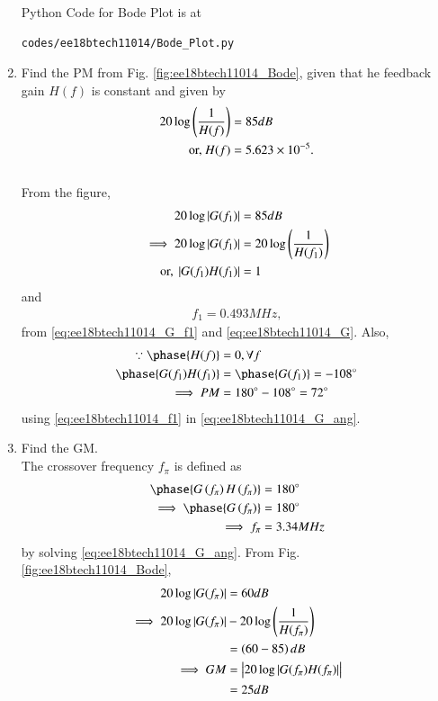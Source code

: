 \begin{enumerate}[label=\thesection.\arabic*.,ref=\thesection.\theenumi]
Python Code for Bode Plot is at
\begin{lstlisting}
codes/ee18btech11014/Bode_Plot.py
\end{lstlisting}

\item Find the PM from  Fig. 	\ref{fig:ee18btech11014_Bode}, given that he feedback gain $H(f)$ is constant and given by 
\begin{align}
20 \log \left(\frac{1}{H(f) }\right) &= 85 dB
\\
\text{or, } H(f) &= 5.623 \times 10^{-5}.
\label{eq:ee18btech11014_H}
\end{align}
\\
\solution From the figure, 
\begin{align}
\label{eq:ee18btech11014_G_f1}
20 \log \left\vert G(f_1)\right\vert &= 85 dB
\\
\implies 20 \log \left\vert G(f_1)\right\vert & = 20 \log \left(\frac{1}{H(f_1) }\right)
\\
\text{or, } \left\vert G(f_1)H(f_1)\right\vert &= 1
\end{align}
and 
\begin{align}
\label{eq:ee18btech11014_f1}
f_1 = 0.493 MHz, 
\end{align}
from \eqref{eq:ee18btech11014_G_f1} and \eqref{eq:ee18btech11014_G}.
Also,
%
\begin{align}
\because \phase{H(f)} &= 0, \forall f
\\
\phase{G(f_1)H(f_1)} &= \phase{G(f_1)} = -108 \degree
\\
\implies PM &= 180 \degree - 108 \degree = 72 \degree
\end{align}
using \eqref{eq:ee18btech11014_f1} in \eqref{eq:ee18btech11014_G_ang}.

\item Find the GM.
\\
\solution The crossover frequency $f_{\pi}$ is defined as 
\begin{align}
\phase{G\brak{f_{\pi}}H\brak{f_{\pi}}} &= 180 \degree
\\
\implies \phase{G\brak{f_{\pi}}} &= 180 \degree
\\
\implies f_{\pi} &= 3.34 MHz
\end{align}
by solving \eqref{eq:ee18btech11014_G_ang}.
From Fig. \ref{fig:ee18btech11014_Bode}, 
\begin{align}
20 \log \left\vert G(f_\pi)\right\vert &= 60 dB
\\
\implies 20 \log \left\vert G(f_\pi)\right\vert &-  20 \log \left(\frac{1}{H(f_\pi) }\right)   
\nonumber \\
&= \left(60 -85\right) dB
\\
\implies GM &= \left\vert20 \log \left\vert G(f_\pi)H(f_\pi) \right\vert\right\vert 
\nonumber \\
&= 25 dB
\end{align}
%


\end{enumerate}
